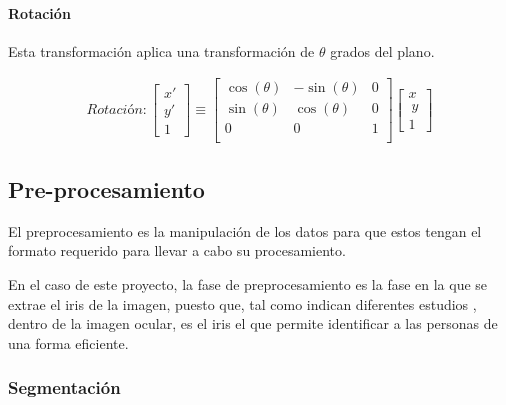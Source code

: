 \paragraph{Rotación}

Esta transformación aplica una transformación de $\theta$ grados del plano.



\begin{gather}
	Rotación:
	\begin{bmatrix} x' \\ y' \\ 1 \end{bmatrix}
	\equiv
	 \begin{bmatrix}
	  \cos(\theta) &-\sin(\theta) & 0 \\
	  \sin(\theta) & \cos(\theta) & 0 \\
	  0 & 0 & 1 \\
	  \end{bmatrix}
	  \begin{bmatrix} x \\\ y \\ 1 \end{bmatrix}
\end{gather}


\subsection{Pre-procesamiento} \label{preprocesamiento}

El preprocesamiento es la manipulación de los datos para que estos tengan el formato requerido para llevar a cabo su procesamiento.

En el caso de este proyecto, la fase de preprocesamiento es la fase en la que se extrae el iris de la imagen, puesto que, tal como indican diferentes estudios \cite{tfg_iris_2020} \cite{abdullah_iris_2015} \cite{malgheet_iris_2021} \cite{dd_post-mortem_2020} \cite{liu_efficient_2021} \cite{szymkowski_iris-based_2021} \cite{lozej_end--end_2018}, dentro de la imagen ocular, es el iris el que  
permite identificar a las personas de una forma eficiente.

\subsubsection{Segmentación} \label{subsubsec:segmentacion}

